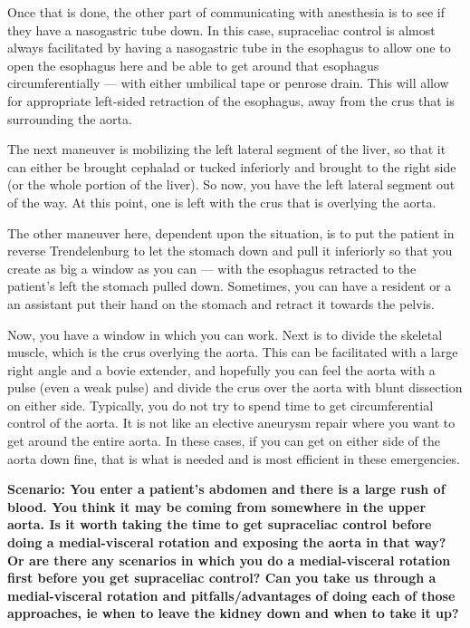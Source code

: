 \documentclass[
]{book}
\begin{document}
Once that is done, the other part of communicating with anesthesia is to
see if they have a nasogastric tube down. In this case, supraceliac
control is almost always facilitated by having a nasogastric tube in the
esophagus to allow one to open the esophagus here and be able to get
around that esophagus circumferentially --- with either umbilical tape
or penrose drain. This will allow for appropriate left-sided retraction
of the esophagus, away from the crus that is surrounding the aorta.

The next maneuver is mobilizing the left lateral segment of the liver,
so that it can either be brought cephalad or tucked inferiorly and
brought to the right side (or the whole portion of the liver). So now,
you have the left lateral segment out of the way. At this point, one is
left with the crus that is overlying the aorta.

The other maneuver here, dependent upon the situation, is to put the
patient in reverse Trendelenburg to let the stomach down and pull it
inferiorly so that you create as big a window as you can --- with the
esophagus retracted to the patient's left the stomach pulled down.
Sometimes, you can have a resident or a an assistant put their hand on
the stomach and retract it towards the pelvis.

Now, you have a window in which you can work. Next is to divide the
skeletal muscle, which is the crus overlying the aorta. This can be
facilitated with a large right angle and a bovie extender, and hopefully
you can feel the aorta with a pulse (even a weak pulse) and divide the
crus over the aorta with blunt dissection on either side. Typically, you
do not try to spend time to get circumferential control of the aorta. It
is not like an elective aneurysm repair where you want to get around the
entire aorta. In these cases, if you can get on either side of the aorta
down fine, that is what is needed and is most efficient in these
emergencies.

\textbf{Scenario: You enter a patient's abdomen and there is a large rush of
blood. You think it may be coming from somewhere in the upper aorta. Is
it worth taking the time to get supraceliac control before doing a
medial-visceral rotation and exposing the aorta in that way? Or are
there any scenarios in which you do a medial-visceral rotation first
before you get supraceliac control? Can you take us through a
medial-visceral rotation and pitfalls/advantages of doing each of those
approaches, ie when to leave the kidney down and when to take it up?}
\end{document}
